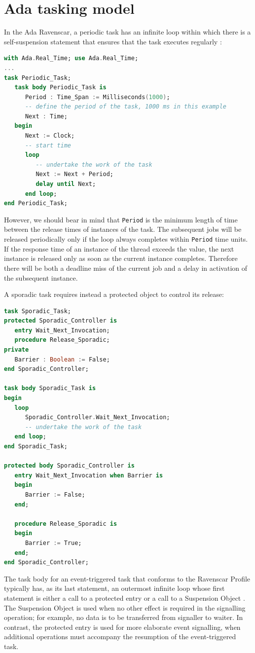 \documentclass{article}
\begin{document}
\section{Ada tasking model}

In the Ada Ravenscar, a periodic task has an infinite loop within which there is a self-suspension statement that ensures that the task executes regularly \cite{ada-tasks}:

\begin{lstlisting}[language=Ada]
with Ada.Real_Time; use Ada.Real_Time;
...
task Periodic_Task;
   task body Periodic_Task is
      Period : Time_Span := Milliseconds(1000);
      -- define the period of the task, 1000 ms in this example
      Next : Time;
   begin
      Next := Clock;
      -- start time
      loop
         -- undertake the work of the task
         Next := Next + Period;
         delay until Next;
      end loop;
end Periodic_Task;
\end{lstlisting}

However, we should bear in mind that \texttt{Period} is the minimum length of time between the release times of instances of the task. The subsequent jobs will be released periodically only if the loop always completes within \texttt{Period} time units. If the response time of an instance of the thread exceeds the value, the next instance is released only as soon as the current instance completes. Therefore there will be both a deadline miss of the current job and a delay in activation of the subsequent instance.

A sporadic task requires instead a protected object to control its release:

\begin{lstlisting}[language=Ada]
task Sporadic_Task;
protected Sporadic_Controller is
   entry Wait_Next_Invocation;
   procedure Release_Sporadic;
private
   Barrier : Boolean := False;
end Sporadic_Controller;

task body Sporadic_Task is
begin
   loop
      Sporadic_Controller.Wait_Next_Invocation;
      -- undertake the work of the task
   end loop;
end Sporadic_Task;

protected body Sporadic_Controller is
   entry Wait_Next_Invocation when Barrier is
   begin
      Barrier := False;
   end;

   procedure Release_Sporadic is
   begin
      Barrier := True;
   end;
end Sporadic_Controller;
\end{lstlisting}

The task body for an event-triggered task that conforms to the Ravenscar Profile typically has, as its last statement, an outermost infinite loop whose first statement is either a call to a protected entry or a call to a Suspension Object \cite{ycs}. The Suspension Object is used when no other effect is required in the signalling operation; for example, no data is to be transferred from signaller to waiter. In contrast, the protected entry is used for more elaborate event signalling, when additional operations must accompany the resumption of the event-triggered task.
\end{document}
